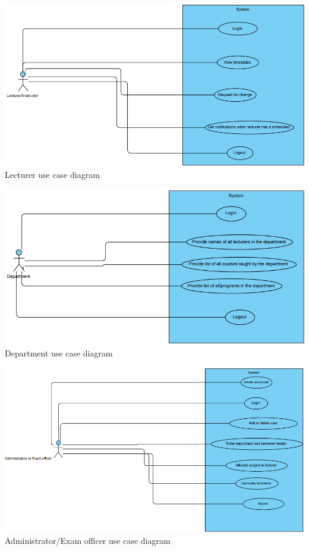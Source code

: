\documentclass{scrreprt}
\begin{document}
\begin{center}
\includegraphics[scale=0.6]{lecturer.png}
Lecturer use case diagram
\end{center}
\begin{center}
\includegraphics[scale=0.6]{department.png}
Department use case diagram
\end{center}
\begin{center}
\includegraphics[scale=0.6]{admin.png}
Administrator/Exam officer use case diagram
\end{center}
\end{document}
